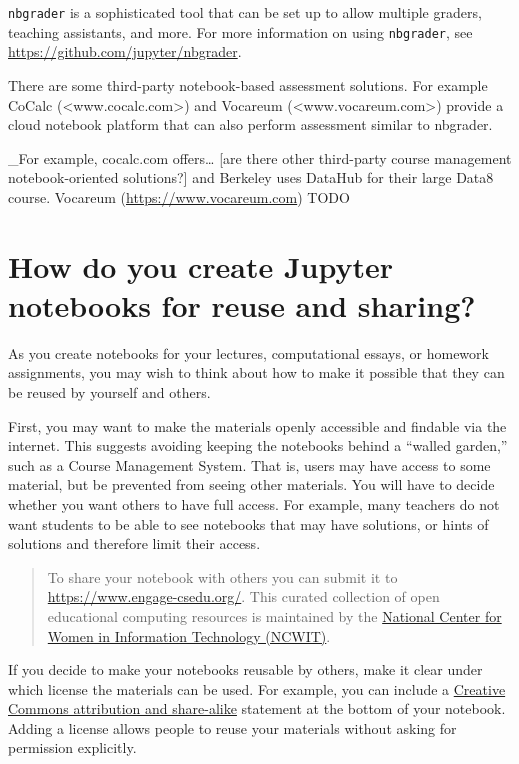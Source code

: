 \documentclass[]{book}
\begin{document}
\texttt{nbgrader} is a sophisticated tool that can be set up to allow
multiple graders, teaching assistants, and more. For more information on
using \texttt{nbgrader}, see \url{https://github.com/jupyter/nbgrader}.

There are some third-party notebook-based assessment solutions. For
example CoCalc (\textless{}www.cocalc.com\textgreater{}) and Vocareum
(\textless{}www.vocareum.com\textgreater{}) provide a cloud notebook
platform that can also perform assessment similar to nbgrader.

\_For example, cocalc.com offers\ldots{} {[}are there other third-party
course management notebook-oriented solutions?{]} and Berkeley uses
DataHub for their large Data8 course. Vocareum
(\url{https://www.vocareum.com}) TODO

\section{How do you create Jupyter notebooks for reuse and
sharing?}\label{how-do-you-create-jupyter-notebooks-for-reuse-and-sharing}

As you create notebooks for your lectures, computational essays, or
homework assignments, you may wish to think about how to make it
possible that they can be reused by yourself and others.

First, you may want to make the materials openly accessible and findable
via the internet. This suggests avoiding keeping the notebooks behind a
``walled garden,'' such as a Course Management System. That is, users
may have access to some material, but be prevented from seeing other
materials. You will have to decide whether you want others to have full
access. For example, many teachers do not want students to be able to
see notebooks that may have solutions, or hints of solutions and
therefore limit their access.

\begin{quote}
To share your notebook with others you can submit it to
\url{https://www.engage-csedu.org/}. This curated collection of open
educational computing resources is maintained by the
\href{https://www.ncwit.org/}{National Center for Women in Information
Technology (NCWIT)}.
\end{quote}

If you decide to make your notebooks reusable by others, make it clear
under which license the materials can be used. For example, you can
include a
\href{https://creativecommons.org/licenses/by-sa/3.0/us/}{Creative
Commons attribution and share-alike} statement at the bottom of your
notebook. Adding a license allows people to reuse your materials without
asking for permission explicitly.
\end{document}
